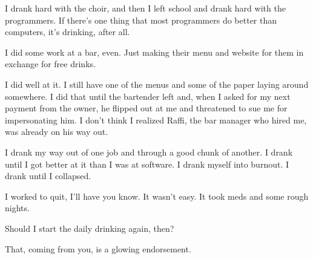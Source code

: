 
I drank hard with the choir, and then I left school and drank hard with the programmers. If there's one thing that most programmers do better than computers, it's drinking, after all.

I did some work at a bar, even. Just making their menu and website for them in exchange for free drinks.


I did well at it. I still have one of the menus and some of the paper laying around somewhere. I did that until the bartender left and, when I asked for my next payment from the owner, he flipped out at me and threatened to sue me for impersonating him. I don't think I realized Raffi, the bar manager who hired me, was already on his way out.

I drank my way out of one job and through a good chunk of another. I drank until I got better at it than I was at software. I drank myself into burnout. I drank until I collapsed.


I worked to quit, I'll have you know. It wasn't easy. It took meds and some rough nights.


Should I start the daily drinking again, then?


That, coming from you, is a glowing endorsement.


\newpage
